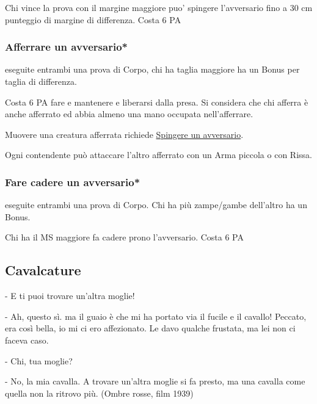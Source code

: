 \documentclass[12pt,a4paper,twoside,openany]{book}
\begin{document}
\begin{multicols}{2}
Chi vince la prova con il margine maggiore puo' spingere l'avversario fino a 30 cm punteggio di margine di differenza. Costa 6 PA

\subsubsection{Afferrare un avversario*}\label{afferrareunavversario}

eseguite entrambi una prova di Corpo, chi ha taglia maggiore ha un Bonus per taglia di differenza.

Costa 6 PA fare e mantenere e liberarsi dalla presa. Si considera che chi afferra è anche afferrato ed abbia almeno una mano occupata nell'afferrare.

Muovere una creatura afferrata richiede \hyperlink{spingereavversario}{Spingere un avversario}.

Ogni contendente può attaccare l'altro afferrato con un Arma piccola o con Rissa.

\subsubsection{Fare cadere un avversario*} \label{farecadereavversario}

eseguite entrambi una prova di Corpo. Chi ha più zampe/gambe dell'altro ha un Bonus.

Chi ha il MS maggiore fa cadere prono l'avversario. Costa 6 PA



\subsection{Cavalcature}\label{cavalcature}

\begin{changemargin}{0.3cm}{0.3cm}\begin{enfasi}{
	- E ti puoi trovare un'altra moglie!
	
	- Ah, questo sì. ma il guaio è che mi ha portato via il fucile e il cavallo! Peccato, era così bella, io mi ci ero affezionato. Le davo qualche frustata, ma lei non ci faceva caso.
	
	- Chi, tua moglie?
	
	- No, la mia cavalla. A trovare un'altra moglie si fa presto, ma una cavalla come quella non la ritrovo più. (Ombre rosse, film 1939)}\end{enfasi}\end{changemargin}\medskip


\end{multicols}
\end{document}
